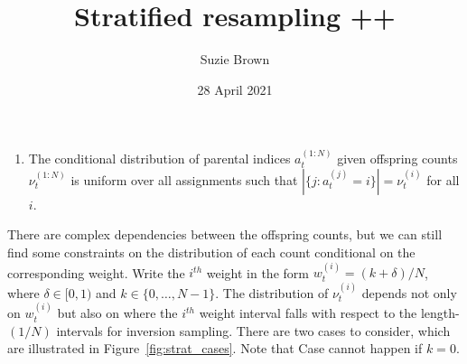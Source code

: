 \documentclass{article}
\title{Stratified resampling ++}
\author{Suzie Brown}
\date{28 April 2021}
\theoremstyle{definition}
\newcommand{\1}[1]{\mathbbm{1}_{#1}} %
\begin{document}
\maketitle
\thispagestyle{fancy}

\begin{enumerate}[label=(A\arabic*)]
\item\label{standing_assumption} The conditional distribution of parental indices $a_t^{(1:N)}$ given offspring counts $\nu_t^{(1:N)}$ is uniform over all assignments such that $ |\{ j: a_t^{(j)} =i \}|= \nu_t^{(i)} $ for all $i$.
\end{enumerate}



There are complex dependencies between the offspring counts, but we can still find some constraints on the distribution of each count conditional on the corresponding weight.
Write the $i^{th}$ weight in the form $w_t^{(i)} = (k + \delta)/N$, where $\delta \in [0,1)$ and $k\in \{0,\dots,N-1\}$.
The distribution of $\nu_t^{(i)}$ depends not only on $w_t^{(i)}$ but also on where the $i^{th}$ weight interval falls with respect to the length-$(1/N)$ intervals for inversion sampling. There are two cases to consider, which are illustrated in Figure~\ref{fig:strat_cases}. Note that Case  cannot happen if $k=0$.

\end{document}
